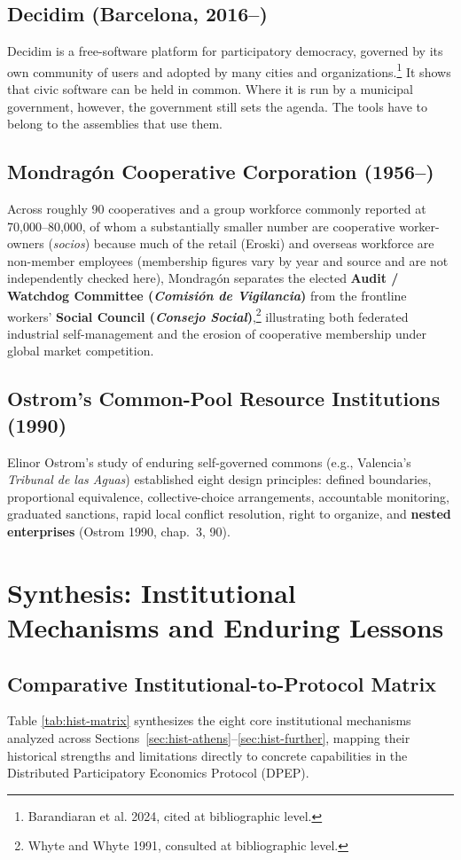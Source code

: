 \documentclass[10pt,twoside,openany]{book}
\theoremstyle{dpepstyle}
\begin{document}
\subsection{Decidim (Barcelona, 2016--)}
Decidim is a free-software platform for participatory democracy, governed by its own community of users and adopted by many cities and organizations.\footnote{Barandiaran et al. 2024, cited at bibliographic level.} It shows that civic software can be held in common. Where it is run by a municipal government, however, the government still sets the agenda. The tools have to belong to the assemblies that use them.

\subsection{Mondrag\'on Cooperative Corporation (1956--)}
Across roughly 90 cooperatives and a group workforce commonly reported at 70,000--80,000, of whom a substantially smaller number are cooperative worker-owners (\emph{socios}) because much of the retail (Eroski) and overseas workforce are non-member employees (membership figures vary by year and source and are not independently checked here), Mondrag\'on separates the elected \textbf{Audit / Watchdog Committee (\emph{Comisi\'on de Vigilancia})} from the frontline workers' \textbf{Social Council (\emph{Consejo Social})},\footnote{Whyte and Whyte 1991, consulted at bibliographic level.} illustrating both federated industrial self-management and the erosion of cooperative membership under global market competition.

\subsection{Ostrom's Common-Pool Resource Institutions (1990)}
Elinor Ostrom's study of enduring self-governed commons (e.g., Valencia's \emph{Tribunal de las Aguas}) established eight design principles: defined boundaries, proportional equivalence, collective-choice arrangements, accountable monitoring, graduated sanctions, rapid local conflict resolution, right to organize, and \textbf{nested enterprises} (Ostrom 1990, chap.~3, 90).

\section{Synthesis: Institutional Mechanisms and Enduring Lessons}
\label{sec:hist-synthesis}

\subsection{Comparative Institutional-to-Protocol Matrix}
Table \ref{tab:hist-matrix} synthesizes the eight core institutional mechanisms analyzed across Sections~\ref{sec:hist-athens}--\ref{sec:hist-further}, mapping their historical strengths and limitations directly to concrete capabilities in the Distributed Participatory Economics Protocol (DPEP).
\end{document}
